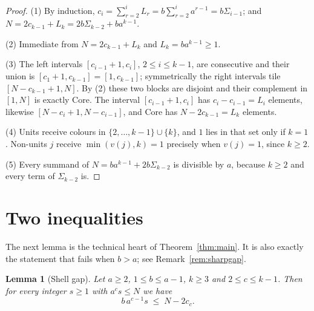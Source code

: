 \documentclass{amsart}
\newtheorem{lemma}[theorem]{Lemma}
\theoremstyle{definition}
\newcommand{\Core}{\mathrm{Core}}
\begin{document}
\begin{proof}
(1) By induction, $c_i=\sum_{r=2}^{i}L_r=b\sum_{r=2}^{i}a^{r-1}=b\Sigma_{i-1}$;
and $N=2c_{k-1}+L_k=2b\Sigma_{k-2}+ba^{k-1}$.

(2) Immediate from $N=2c_{k-1}+L_k$ and $L_k=ba^{k-1}\ge1$.

(3) The left intervals $[c_{i-1}+1,c_i]$, $2\le i\le k-1$, are consecutive and
their union is $[c_1+1,c_{k-1}]=[1,c_{k-1}]$; symmetrically the right intervals
tile $[N-c_{k-1}+1,N]$.  By (2) these two blocks are disjoint and their
complement in $[1,N]$ is exactly $\Core$.  The interval $[c_{i-1}+1,c_i]$ has
$c_i-c_{i-1}=L_i$ elements, likewise $[N-c_i+1,N-c_{i-1}]$, and $\Core$ has
$N-2c_{k-1}=L_k$ elements.

(4) Units receive colours in $\{2,\dots,k-1\}\cup\{k\}$, and $1$ lies in that
set only if $k=1$.  Non-units $j$ receive $\min(v(j),k)=1$ precisely when
$v(j)=1$, since $k\ge2$.

(5) Every summand of $N=ba^{k-1}+2b\Sigma_{k-2}$ is divisible by $a$, because
$k\ge2$ and every term of $\Sigma_{k-2}$ is.
\end{proof}

\section{Two inequalities}

The next lemma is the technical heart of Theorem~\ref{thm:main}.  It is also
exactly the statement that fails when $b>a$; see Remark~\ref{rem:sharpgap}.

\begin{lemma}[Shell gap]\label{lem:gap}
Let $a\ge2$, $1\le b\le a-1$, $k\ge3$ and $2\le c\le k-1$.  Then for every
integer $s\ge1$ with $a^cs\le N$ we have
\[
  b\,a^{c-1}s\;\le\;N-2c_c .
\]
\end{lemma}
\end{document}
